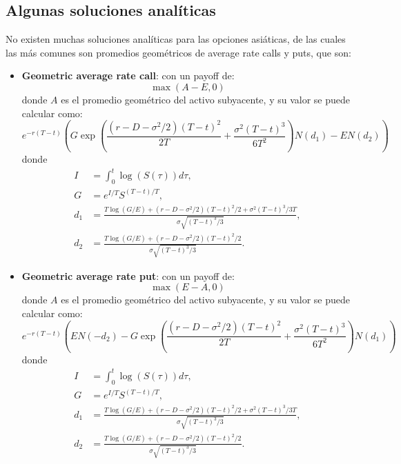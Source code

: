 \subsection{Algunas soluciones analíticas}
No existen muchas soluciones analíticas para las opciones asiáticas, de las cuales las más comunes son promedios geométricos de average rate calls y puts, que son:
\begin{itemize}
    \item \textbf{Geometric average rate call}: con un payoff de:
    \begin{equation*}
        \max(A-E, 0)
    \end{equation*}
    donde $A$ es el promedio geométrico del activo subyacente, y su valor se puede calcular como:
    \begin{equation*}
        \boxed{e^{-r(T-t)} \left( G \exp\left( \frac{(r-D-\sigma^2/2)(T-t)^2}{2T} + \frac{\sigma^2 (T-t)^3}{6T^2} \right) N(d_1) - E N(d_2) \right)}
    \end{equation*}
    donde
    \begin{align*}
        I &= \int_0^t \log(S(\tau)) d\tau, \\
        G &= e^{I/T} S^{(T-t)/T}, \\
        d_1 &= \frac{T \log(G/E) + (r-D-\sigma^2/2)(T-t)^2/2 + \sigma^2 (T-t)^3/3T}{\sigma \sqrt{(T-t)^3/3}}, \\
        d_2 &= \frac{T \log(G/E) + (r-D-\sigma^2/2)(T-t)^2/2}{\sigma \sqrt{(T-t)^3/3}}.
    \end{align*}

    \item \textbf{Geometric average rate put}: con un payoff de:
    \begin{equation*}
        \max(E-A, 0)
    \end{equation*}
    donde $A$ es el promedio geométrico del activo subyacente, y su valor se puede calcular como:
    \begin{equation*}
        \boxed{e^{-r(T-t)} \left( E N(-d_2) - G \exp\left( \frac{(r-D-\sigma^2/2)(T-t)^2}{2T} + \frac{\sigma^2 (T-t)^3}{6T^2} \right) N(d_1) \right)}
    \end{equation*}
    donde
    \begin{align*}
        I &= \int_0^t \log(S(\tau)) d\tau, \\
        G &= e^{I/T} S^{(T-t)/T}, \\
        d_1 &= \frac{T \log(G/E) + (r-D-\sigma^2/2)(T-t)^2/2 + \sigma^2 (T-t)^3/3T}{\sigma \sqrt{(T-t)^3/3}}, \\
        d_2 &= \frac{T \log(G/E) + (r-D-\sigma^2/2)(T-t)^2/2}{\sigma \sqrt{(T-t)^3/3}}.
    \end{align*}
\end{itemize}





